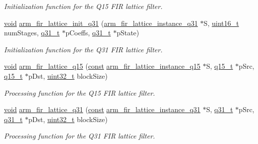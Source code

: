 \begin{DoxyCompactItemize}
\begin{DoxyCompactList}\small\item\em Initialization function for the Q15 F\-I\-R lattice filter. \end{DoxyCompactList}\item 
\hyperlink{group___n_a_m_e_ga18028b8badbf1ea7e704ccac3c488e82}{void} \hyperlink{group___f_i_r___lattice_gac05a17a0188bb851b58d19e572870a54}{arm\-\_\-fir\-\_\-lattice\-\_\-init\-\_\-q31} (\hyperlink{structarm__fir__lattice__instance__q31}{arm\-\_\-fir\-\_\-lattice\-\_\-instance\-\_\-q31} $\ast$S, \hyperlink{stdint_8h_a273cf69d639a59973b6019625df33e30}{uint16\-\_\-t} num\-Stages, \hyperlink{arm__math_8h_adc89a3547f5324b7b3b95adec3806bc0}{q31\-\_\-t} $\ast$p\-Coeffs, \hyperlink{arm__math_8h_adc89a3547f5324b7b3b95adec3806bc0}{q31\-\_\-t} $\ast$p\-State)
\begin{DoxyCompactList}\small\item\em Initialization function for the Q31 F\-I\-R lattice filter. \end{DoxyCompactList}\item 
\hyperlink{group___n_a_m_e_ga18028b8badbf1ea7e704ccac3c488e82}{void} \hyperlink{group___f_i_r___lattice_gabb0ab07fd313b4d863070c3ddca51542}{arm\-\_\-fir\-\_\-lattice\-\_\-q15} (\hyperlink{group___n_a_m_e_ga7ae6d0e43244213b34de2c2b9aa30da6}{const} \hyperlink{structarm__fir__lattice__instance__q15}{arm\-\_\-fir\-\_\-lattice\-\_\-instance\-\_\-q15} $\ast$S, \hyperlink{arm__math_8h_ab5a8fb21a5b3b983d5f54f31614052ea}{q15\-\_\-t} $\ast$p\-Src, \hyperlink{arm__math_8h_ab5a8fb21a5b3b983d5f54f31614052ea}{q15\-\_\-t} $\ast$p\-Dst, \hyperlink{stdint_8h_a435d1572bf3f880d55459d9805097f62}{uint32\-\_\-t} block\-Size)
\begin{DoxyCompactList}\small\item\em Processing function for the Q15 F\-I\-R lattice filter. \end{DoxyCompactList}\item 
\hyperlink{group___n_a_m_e_ga18028b8badbf1ea7e704ccac3c488e82}{void} \hyperlink{group___f_i_r___lattice_ga2e36fd210e4a1a5dd333ce80dd6d9a88}{arm\-\_\-fir\-\_\-lattice\-\_\-q31} (\hyperlink{group___n_a_m_e_ga7ae6d0e43244213b34de2c2b9aa30da6}{const} \hyperlink{structarm__fir__lattice__instance__q31}{arm\-\_\-fir\-\_\-lattice\-\_\-instance\-\_\-q31} $\ast$S, \hyperlink{arm__math_8h_adc89a3547f5324b7b3b95adec3806bc0}{q31\-\_\-t} $\ast$p\-Src, \hyperlink{arm__math_8h_adc89a3547f5324b7b3b95adec3806bc0}{q31\-\_\-t} $\ast$p\-Dst, \hyperlink{stdint_8h_a435d1572bf3f880d55459d9805097f62}{uint32\-\_\-t} block\-Size)
\begin{DoxyCompactList}\small\item\em Processing function for the Q31 F\-I\-R lattice filter. \end{DoxyCompactList}\end{DoxyCompactItemize}


